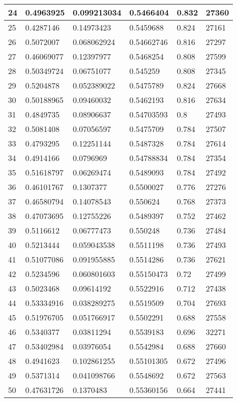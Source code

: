\begin{longtable}{|l|l|l|l|l|l|}
24 & 0.4963925 & 0.099213034 & 0.5466404 & 0.832 & 27360 \\ \hline 
25 & 0.4287146 & 0.14973423 & 0.5459688 & 0.824 & 27161 \\ \hline 
26 & 0.5072007 & 0.068062924 & 0.54662746 & 0.816 & 27297 \\ \hline 
27 & 0.46069077 & 0.12397977 & 0.5468254 & 0.808 & 27599 \\ \hline 
28 & 0.50349724 & 0.06751077 & 0.545259 & 0.808 & 27345 \\ \hline 
29 & 0.5204878 & 0.052389022 & 0.5475789 & 0.824 & 27668 \\ \hline 
30 & 0.50188965 & 0.09460032 & 0.5462193 & 0.816 & 27634 \\ \hline 
31 & 0.4849735 & 0.08906637 & 0.54703593 & 0.8 & 27493 \\ \hline 
32 & 0.5081408 & 0.07056597 & 0.5475709 & 0.784 & 27507 \\ \hline 
33 & 0.4793295 & 0.12251144 & 0.5487328 & 0.784 & 27614 \\ \hline 
34 & 0.4914166 & 0.0796969 & 0.54788834 & 0.784 & 27354 \\ \hline 
35 & 0.51618797 & 0.06269474 & 0.5489093 & 0.784 & 27492 \\ \hline 
36 & 0.46101767 & 0.1307377 & 0.5500027 & 0.776 & 27276 \\ \hline 
37 & 0.46580794 & 0.14078543 & 0.550624 & 0.768 & 27373 \\ \hline 
38 & 0.47073695 & 0.12755226 & 0.5489397 & 0.752 & 27462 \\ \hline 
39 & 0.5116612 & 0.06777473 & 0.550248 & 0.736 & 27484 \\ \hline 
40 & 0.5213444 & 0.059043538 & 0.5511198 & 0.736 & 27493 \\ \hline 
41 & 0.51077086 & 0.091955885 & 0.5514286 & 0.736 & 27621 \\ \hline 
42 & 0.5234596 & 0.060801603 & 0.55150473 & 0.72 & 27499 \\ \hline 
43 & 0.5023468 & 0.09614192 & 0.5522916 & 0.712 & 27438 \\ \hline 
44 & 0.53334916 & 0.038289275 & 0.5519509 & 0.704 & 27693 \\ \hline 
45 & 0.51976705 & 0.051766917 & 0.5502291 & 0.688 & 27558 \\ \hline 
46 & 0.5340377 & 0.03811294 & 0.5539183 & 0.696 & 32271 \\ \hline 
47 & 0.53402984 & 0.03976054 & 0.5542984 & 0.688 & 27660 \\ \hline 
48 & 0.4941623 & 0.102861255 & 0.55101305 & 0.672 & 27496 \\ \hline 
49 & 0.5371314 & 0.041098766 & 0.5548692 & 0.672 & 27563 \\ \hline 
50 & 0.47631726 & 0.1370483 & 0.55360156 & 0.664 & 27441 \\ \hline 
\end{longtable}